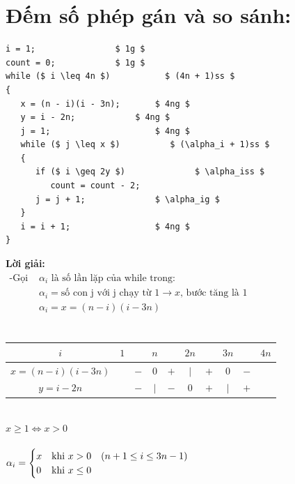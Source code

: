 \documentclass[12pt, letterpaper]{article}
\begin{document}
\section{Đếm số phép gán và so sánh:}
\begin{lstlisting}
i = 1;			      $ 1g $
count = 0;		      $ 1g $
while ($ i \leq 4n $)		    $ (4n + 1)ss $
{
   x = (n - i)(i - 3n);       $ 4ng $
   y = i - 2n;		      $ 4ng $
   j = 1;                     $ 4ng $
   while ($ j \leq x $)		     $ (\alpha_i + 1)ss $
   {
      if ($ i \geq 2y $)      	      $ \alpha_iss $
         count = count - 2;
      j = j + 1;              $ \alpha_ig $
   }
   i = i + 1;        	      $ 4ng $
}
	\end{lstlisting}
\textbf{Lời giải:} \\
$ \begin{aligned}
		\text{-Gọi } & \alpha_i \text{ là số lần lặp của while trong:}                                  \\
		             & \alpha_i = \text{số con j với j chạy từ 1} \rightarrow x \text{, bước tăng là 1} \\
		             & \alpha_i = x = (n-i)(i-3n)                                                       \\
	\end{aligned} $ \\
 \\
\begin{table}[htb]
	\begin{tabular}{c|c c c c c c c c c}
		$i$               & $1$ &     & $n$     &     & $2n$    &     & $3n$    &     & $4n$ \\
		\hline
		$x = (n-i)(i-3n)$ &     & $-$ & $0$     & $+$ & $\vert$ & $+$ & $0$     & $-$        \\
		\hline
		$y = i - 2n$      &     & $-$ & $\vert$ & $-$ & $0$     & $+$ & $\vert$ & $+$        \\
	\end{tabular}
\end{table} \\
 $x \geq 1 \Leftrightarrow x > 0$ \\ \\
$\alpha_i =
\begin{cases}
	x & \text{khi } x>0 \quad (n + 1 \leq i \leq 3n - 1) \\
	0 & \text{khi } x\leq 0
\end{cases} \\$
 \\
\end{document}
